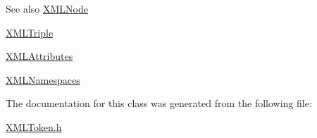 \begin{DoxySeeAlso}{See also}
\hyperlink{class_x_m_l_node}{X\+M\+L\+Node} 

\hyperlink{class_x_m_l_triple}{X\+M\+L\+Triple} 

\hyperlink{class_x_m_l_attributes}{X\+M\+L\+Attributes} 

\hyperlink{class_x_m_l_namespaces}{X\+M\+L\+Namespaces} 
\end{DoxySeeAlso}


The documentation for this class was generated from the following file\+:\begin{DoxyCompactItemize}
\item 
\hyperlink{_x_m_l_token_8h}{X\+M\+L\+Token.\+h}\end{DoxyCompactItemize}
